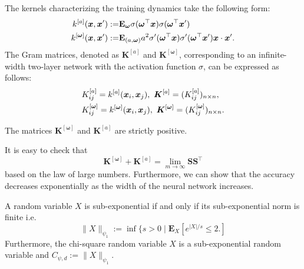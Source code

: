 The kernels characterizing the training dynamics take the following form:\begin{align}
    k^{[a]}(\boldsymbol{x},\boldsymbol{x}'):=&\mathbf{E}_{\boldsymbol{\omega}}\sigma(\boldsymbol{\omega}^{\top}\boldsymbol{x})\sigma(\boldsymbol{\omega}^{\top}\boldsymbol{x}')\notag\\k^{[\boldsymbol{\omega}]}(\boldsymbol{x},\boldsymbol{x}'):=&\mathbf{E}_{(a,\boldsymbol{\omega})}a^2\sigma'(\boldsymbol{\omega}^{\top}\boldsymbol{x})\sigma'(\boldsymbol{\omega}^{\top}\boldsymbol{x}')\boldsymbol{x}\cdot\boldsymbol{x}'.
\end{align} The Gram matrices, denoted as $\boldsymbol{K}^{[a]}$ and $\boldsymbol{K}^{[\boldsymbol{\omega}]}$, corresponding to an infinite-width two-layer network with the activation function $\sigma$, can be expressed as follows:\begin{align}
    &K_{ij}^{[a]}=k^{[a]}(\boldsymbol{x}_i,\boldsymbol{x}_j),~\boldsymbol{K}^{[a]}=(K_{ij}^{[a]})_{n\times n},\notag\\& K_{ij}^{[\boldsymbol{\omega}]}=k^{[\boldsymbol{\omega}]}(\boldsymbol{x}_i,\boldsymbol{x}_j),~\boldsymbol{K}^{[\boldsymbol{\omega}]}=(K_{ij}^{[\boldsymbol{\omega}]})_{n\times n}.
\end{align}

\begin{lemma}
\label{positive}    The matrices \(\boldsymbol{K}^{[\boldsymbol{\omega}]}\) and \(\boldsymbol{K}^{[a]}\) are strictly positive.
\end{lemma}
It is easy to check that
\begin{equation}
    \boldsymbol{K}^{[\boldsymbol{\omega}]} + \boldsymbol{K}^{[a]} = \lim_{m\to \infty} \mathbf{S} \mathbf{S}^{\top}
\end{equation}
based on the law of large numbers. Furthermore, we can show that the accuracy decreases exponentially as the width of the neural network increases.

\begin{definition}
    A random variable $X$ is sub-exponential if and only if its sub-exponential norm is finite i.e.\begin{equation}
        \|X\|_{\psi_1}:=\inf\{s>0\mid\mathbf{E}_X[e^{|X|/s}\le 2.]
    \end{equation} Furthermore, the chi-square random variable $X$ is a sub-exponential random variable and $C_{\psi,d}:=\|X\|_{\psi_1}$.
\end{definition}

